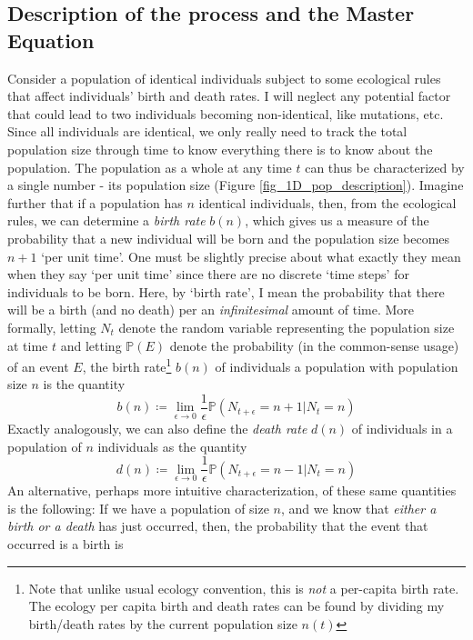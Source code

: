 \subsection{Description of the process and the Master Equation}

Consider a population of identical individuals subject to some ecological rules that affect individuals' birth and death rates. I will neglect any potential factor that could lead to two individuals becoming non-identical, like mutations, etc. Since all individuals are identical, we only really need to track the total population size through time to know everything there is to know about the population. The population as a whole at any time $t$ can thus be characterized by a single number - its population size (Figure \ref{fig_1D_pop_description}). Imagine further that if a population has $n$ identical individuals, then, from the ecological rules, we can determine a \emph{birth rate} $b(n)$, which gives us a measure of the probability that a new individual will be born and the population size becomes $n+1$ `per unit time'. One must be slightly precise about what exactly they mean when they say `per unit time' since there are no discrete `time steps' for individuals to be born. Here, by `birth rate', I mean the probability that there will be a birth (and no death) per an \emph{infinitesimal} amount of time. More formally, letting $N_t$ denote the random variable representing the population size at time $t$ and letting $\mathbb{P}(E)$ denote the probability (in the common-sense usage) of an event $E$, the birth rate\footnote{Note that unlike usual ecology convention, this is \emph{not} a per-capita birth rate. The ecology per capita birth and death rates can be found by dividing my birth/death rates by the current population size $n(t)$} $b(n)$ of individuals a population with population size $n$ is the quantity
\begin{equation}
\label{1D_birthrate_defn}
b(n) \coloneqq \lim_{\epsilon \to 0}\frac{1}{\epsilon}\mathbb{P}\left(N_{t+\epsilon}=n+1 | N_{t}=n\right)
\end{equation}
Exactly analogously, we can also define the \emph{death rate} $d(n)$ of individuals in a population of $n$ individuals as the quantity
\begin{equation}
\label{1D_deathrate_defn}
d(n) \coloneqq \lim_{\epsilon \to 0}\frac{1}{\epsilon}\mathbb{P}\left(N_{t+\epsilon}=n-1 | N_{t}=n\right)
\end{equation}
An alternative, perhaps more intuitive characterization, of these same quantities is the following: If we have a population of size $n$, and we know that \emph{either a birth or a death} has just occurred, then, the probability that the event that occurred is a birth is
